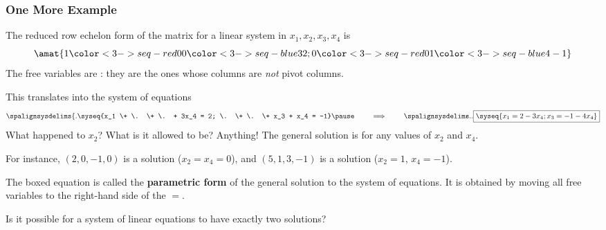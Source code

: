 \begin{frame}
\frametitle{One More Example}

\vskip-1mm
The reduced row echelon form of the matrix for a linear system in
$x_1,x_2,x_3,x_4$ is
\[ \amat{
    1 \color<3->{seq-red}0 0 \color<3->{seq-blue}3 2 ;
    0 \color<3->{seq-red}0 1 \color<3->{seq-blue}4 -1
  } \]
\pause
The free variables are
:
\pause
they are the ones whose
columns are \emph{not} pivot columns.

\pause\medskip
This translates into the system of equations
\[ \spalignsysdelims\{.
\syseq{x_1 \+ \. \+ \. + 3x_4 = 2;
  \.  \+ \. \+ x_3 + x_4 = -1} 
\pause\qquad\implies\qquad\spalignsysdelims..
\framebox{$\syseq{x_1 = 2 - 3x_4; x_3 = -1 - 4x_4\llap.}$}\]
\pause
What happened to $x_2$?  What is it allowed to be?
\pause
Anything!  The general solution is
\webonlycmd{
\[ (x_1,\,x_2,\,x_3,\,x_4) = (2-3x_4,\,x_2,\,-1-4x_4,\,x_4) \]
}%
for any values of $x_2$ and $x_4$.
\begin{webonly}
  For instance, $(2,0,-1,0)$ is a solution ($x_2=x_4=0$), and
  $(5,1,3,-1)$ is a solution ($x_2=1$, $x_4=-1$).
\end{webonly}

\pause
\begin{bluebox}{.8\linewidth}
  The boxed equation is called the \textbf{parametric form} of the general solution to
  the system of equations.  It is obtained by moving all free variables to the
  right-hand side of the $=$.
\end{bluebox}

\end{frame}



\begin{pollframe}

\begin{poll}
\vskip 1cm

\begin{bluebox}[Poll]{.6\textwidth}
  Is it possible for a system of linear equations to have exactly two solutions?
\end{bluebox}
\end{poll}

\end{pollframe}



